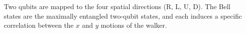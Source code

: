 Two qubits are mapped to the four spatial directions (R, L, U, D). The
Bell states are the maximally entangled two-qubit states, and each
induces a specific correlation between the $x$ and $y$ motions of the
walker.
